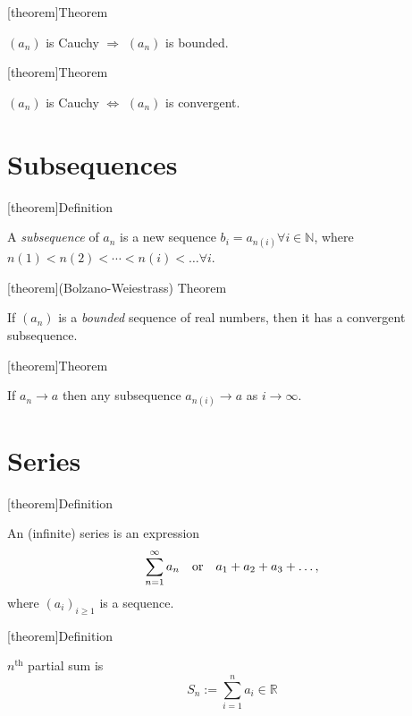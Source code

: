 \documentclass[12pt]{report}
\theoremstyle{definition}
\begin{document}
[theorem]{Theorem}
\begin{cauchy sequence is bounded}
    $(a_n)$ is Cauchy $\Rightarrow$ $(a_n)$ is bounded.
\end{cauchy sequence is bounded}

[theorem]{Theorem}
\begin{cauchy sequence is convergenct}
    $(a_n)$ is Cauchy $\iff$ $(a_n)$ is convergent.
\end{cauchy sequence is convergenct}

\section{Subsequences}
[theorem]{Definition}
\begin{subsequence}
    A \emph{subsequence} of $a_n$ is a new sequence $b_i = a_{n(i)} \forall i \in \mathbb{N}$,
    where $n(1) < n(2) < \cdots < n(i) < \ldots \forall i$.
\end{subsequence}

[theorem]{(Bolzano-Weiestrass) Theorem}
\begin{Bolzano-Weierstrass}
    If $(a_n)$ is a \emph{bounded} sequence of real numbers, then it has a convergent subsequence.
\end{Bolzano-Weierstrass}

[theorem]{Theorem}
\begin{subsequence converge to the same value}
    If $a_n \rightarrow a$ then any subsequence $a_{n(i)} \rightarrow a$ as $i \rightarrow \infty$.
\end{subsequence converge to the same value}

\section{Series}
[theorem]{Definition}
\begin{series}
    An (infinite) series is an expression \[
        \sum_{n=1}^{\infty} a_n \quad \textnormal{or} \quad a_1 + a_2 + a_3 + \ldots,
    \]where ${(a_i)}_{i \ge 1}$ is a sequence.
\end{series}

[theorem]{Definition}
\begin{partial sum}
    $n^{\text{th}}$ partial sum is\[
        S_n := \sum_{i=1}^{n} a_i \in \mathbb{R}
    \]
\end{partial sum}
\end{document}
